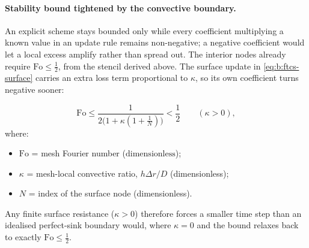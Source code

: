 \documentclass[11pt,a4paper]{article}
\newcommand{\Fo}{\mathrm{Fo}}
\begin{document}
\paragraph{Stability bound tightened by the convective boundary.}
An explicit scheme stays bounded only while every coefficient multiplying a
known value in an update rule remains non-negative; a negative coefficient
would let a local excess amplify rather than spread out. The interior nodes
already require $\mathrm{Fo}\le\tfrac12$, from the stencil derived above.
The surface update in \cref{eq:b:ftcs-surface} carries an extra loss term
proportional to $\kappa$, so its own coefficient turns negative sooner:

\begin{equation}
\Fo \le \frac{1}{2\bigl(1+\kappa(1+\tfrac1N)\bigr)} < \frac12 \qquad (\kappa>0),
\label{eq:b:ftcs-stability}
\end{equation}
\vspace{-0.3em}
\noindent where:

\begin{itemize}[leftmargin=1.6em,itemsep=1pt,topsep=3pt,parsep=0pt]
  \item $\mathrm{Fo}$ = mesh Fourier number ($\mathrm{dimensionless}$);
  \item $\kappa$ = mesh-local convective ratio, $h\Delta r/D$ (dimensionless);
  \item $N$ = index of the surface node (dimensionless).
\end{itemize}
Any finite surface resistance ($\kappa>0$) therefore forces a smaller time
step than an idealised perfect-sink boundary would, where $\kappa=0$ and the
bound relaxes back to exactly $\mathrm{Fo}\le\tfrac12$.
\end{document}
